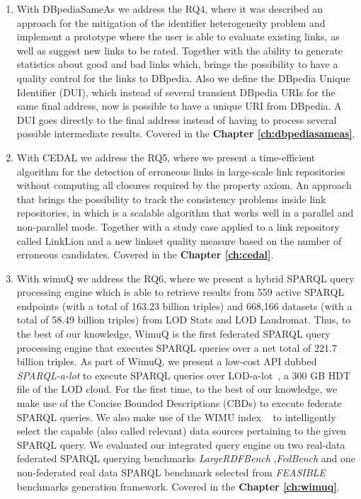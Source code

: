 \begin{enumerate}
    \item With DBpediaSameAs\cite{valdestilhas2015dbpediasameas} we address the RQ4, where it was described an approach for the mitigation of the identifier heterogeneity problem and implement a prototype where the user is able to evaluate existing links, as well as suggest new links to be rated. Together with the ability to generate statistics about good and bad links which, brings the possibility to have a quality control for the links to DBpedia. Also we define the DBpedia Unique Identifier (DUI), which instead of several transient  DBpedia URIs for the same final address, now is possible to have a unique URI from DBpedia. A DUI goes directly to the final address instead of having to process several possible intermediate results.  Covered in the \textbf{Chapter \ref{ch:dbpediasameas}}.
    
    \item With CEDAL\cite{valdestilhas2017cedal} we address the RQ5, where we present a time-efficient algorithm for the detection of erroneous links in large-scale link repositories without computing all closures required by the property axiom. An approach that brings the possibility to track the consistency problems inside link repositories, in which is a scalable algorithm that works well in a parallel and non-parallel mode. Together with a study case applied to a link repository called LinkLion and a new linkset quality measure based on the number of erroneous candidates.  Covered in the \textbf{Chapter \ref{ch:cedal}}.
    
    \item With wimuQ\cite{ValdestilhasKcap} we address the RQ6, where we present a hybrid SPARQL query processing engine which is able to retrieve results from 559 active SPARQL endpoints (with a total of 163.23 billion triples) and 668,166 datasets (with a total of 58.49 billion triples) from LOD Stats and LOD Laudromat. Thus, to the best of our knowledge, WimuQ is the first federated SPARQL query processing engine that executes SPARQL queries over a net total of 221.7 billion triples. As part of WimuQ, we present a low-cost API dubbed \emph{SPARQL-a-lot} to execute SPARQL queries over LOD-a-lot~\cite{fernandez2017lod}, a 300 GB HDT file of the LOD cloud. For the first time, to the best of our knowledge, we make use of the Concise Bounded Descriptions (CBDs) to execute federate SPARQL queries. We also make use of the WIMU index ~\cite{valdestilhas2018my} to intelligently select the capable (also called relevant) \cite{hibiscus2014} data sources pertaining to the given SPARQL query. We evaluated our integrated query engine on two real-data federated SPARQL querying benchmarks \emph{LargeRDFBench} \cite{largerdfbench2017},\emph{FedBench} \cite{fedbench2011} and one non-federated real data SPARQL benchmark selected from \emph{FEASIBLE} \cite{feasible2015} benchmarks generation framework.  Covered in the \textbf{Chapter \ref{ch:wimuq}}.
	
\end{enumerate}

